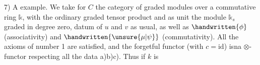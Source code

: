 7) A example. We take for $C$ the category of graded modules over a commutative ring $\mathbb{k}$, with the ordinary graded tensor product and as unit the module $\mathbb{k}_s$ graded in degree zero, datum of $u$ and $v$ as usual, as well as $\handwritten{\phi}$ (associativity) and $\handwritten{\unsure{\mu|\psi}}$ (commutativity). All the axioms of number 1 are satisfied, and the forgetful functor (with $c=\mathrm{id}$) isna $\otimes$-functor respecting all the data a)b)c). Thus if $k$ is
